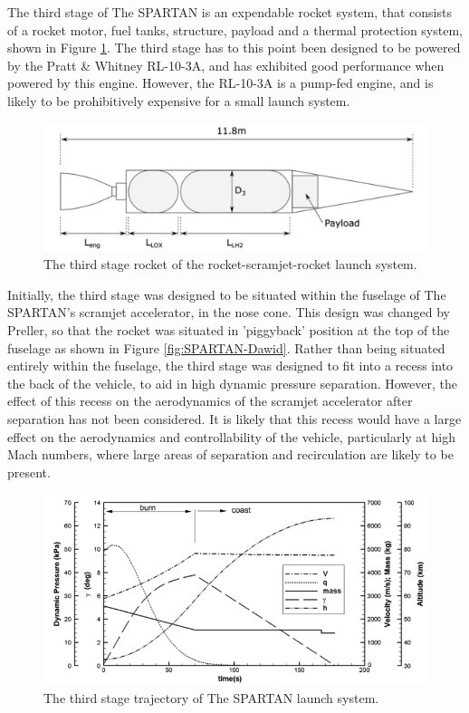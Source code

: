 The third stage of The SPARTAN is an expendable rocket system, that consists of a rocket motor, fuel tanks, structure, payload and a thermal protection system\cite{Preller2017b}, shown in Figure \ref{fig:ThirdStage}. The third stage has to this point been designed to be powered by the Pratt \& Whitney RL-10-3A\cite{Preller2017b}, and has exhibited good performance when powered by this engine. However, the RL-10-3A is a pump-fed engine, and is likely to be prohibitively expensive for a small launch system.
\begin{figure}[ht]
	\centering
	\includegraphics[width=0.7\linewidth]{figures/2_literature-review/ThirdStage}
	\caption{The third stage rocket of the rocket-scramjet-rocket launch system\cite{Preller2017b}.}
	\label{fig:ThirdStage}
\end{figure}
 Initially, the third stage was designed to be situated within the fuselage of The SPARTAN's scramjet accelerator, in the nose cone\cite{Jazra2013}. This design was changed by Preller\cite{Preller2018a,Preller2017b}, so that the rocket was situated in 'piggyback' position at the top of the fuselage as shown in Figure \ref{fig:SPARTAN-Dawid}. Rather than being situated entirely within the fuselage, the third stage was designed to fit into a recess into the back of the vehicle, to aid in high dynamic pressure separation. However, the effect of this recess on the aerodynamics of the scramjet accelerator after separation has not been considered\cite{Preller2018a,Preller2017b}. It is likely that this recess would have a large effect on the aerodynamics and controllability of the vehicle, particularly at high Mach numbers, where large areas of separation and recirculation are likely to be present. 





 
 \begin{figure}[ht]
 	\centering
 	\includegraphics[width=0.9\linewidth]{figures/2_literature-review/SPARTAN_trajthirdstage}
 	\caption{The third stage trajectory of The SPARTAN launch system\cite{Preller2018a}.}
 	\label{fig:SPARTAN_trajthirdstage}
 \end{figure}


